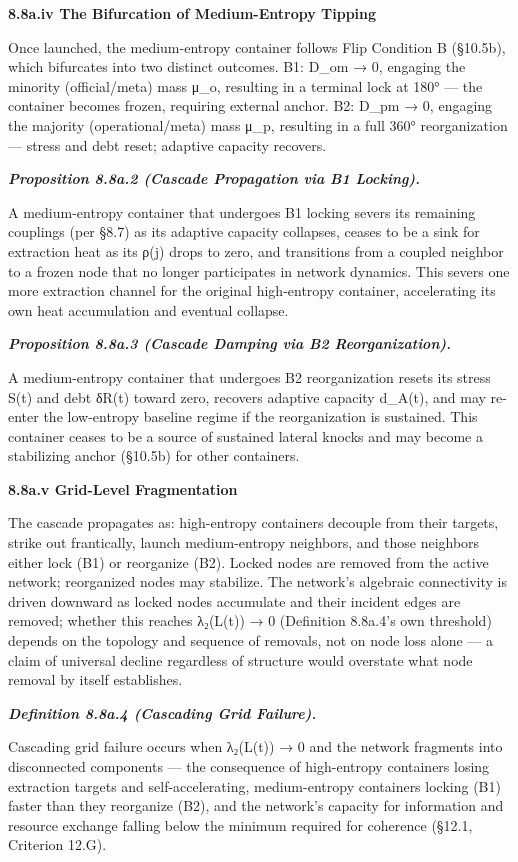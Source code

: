 \documentclass[
]{article}
\begin{document}
\textbf{8.8a.iv The Bifurcation of Medium-Entropy Tipping}

Once launched, the medium-entropy container follows Flip Condition B
(§10.5b), which bifurcates into two distinct outcomes. B1: D\_om → 0,
engaging the minority (official/meta) mass μ\_o, resulting in a terminal
lock at 180° --- the container becomes frozen, requiring external
anchor. B2: D\_pm → 0, engaging the majority (operational/meta) mass
μ\_p, resulting in a full 360° reorganization --- stress and debt reset;
adaptive capacity recovers.

\emph{\textbf{Proposition 8.8a.2 (Cascade Propagation via B1 Locking).}}

A medium-entropy container that undergoes B1 locking severs its
remaining couplings (per §8.7) as its adaptive capacity collapses,
ceases to be a sink for extraction heat as its ρ(j) drops to zero, and
transitions from a coupled neighbor to a frozen node that no longer
participates in network dynamics. This severs one more extraction
channel for the original high-entropy container, accelerating its own
heat accumulation and eventual collapse.

\emph{\textbf{Proposition 8.8a.3 (Cascade Damping via B2
Reorganization).}}

A medium-entropy container that undergoes B2 reorganization resets its
stress S(t) and debt δR(t) toward zero, recovers adaptive capacity
d\_A(t), and may re-enter the low-entropy baseline regime if the
reorganization is sustained. This container ceases to be a source of
sustained lateral knocks and may become a stabilizing anchor (§10.5b)
for other containers.

\textbf{8.8a.v Grid-Level Fragmentation}

The cascade propagates as: high-entropy containers decouple from their
targets, strike out frantically, launch medium-entropy neighbors, and
those neighbors either lock (B1) or reorganize (B2). Locked nodes are
removed from the active network; reorganized nodes may stabilize. The
network's algebraic connectivity is driven downward as locked nodes
accumulate and their incident edges are removed; whether this reaches
λ₂(L(t)) → 0 (Definition 8.8a.4's own threshold) depends on the topology
and sequence of removals, not on node loss alone --- a claim of
universal decline regardless of structure would overstate what node
removal by itself establishes.

\emph{\textbf{Definition 8.8a.4 (Cascading Grid Failure).}}

Cascading grid failure occurs when λ₂(L(t)) → 0 and the network
fragments into disconnected components --- the consequence of
high-entropy containers losing extraction targets and self-accelerating,
medium-entropy containers locking (B1) faster than they reorganize (B2),
and the network's capacity for information and resource exchange falling
below the minimum required for coherence (§12.1, Criterion 12.G).
\end{document}
